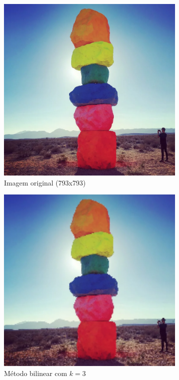 \documentclass[leqno]{article}
\begin{document}
\begin{figure}[H]
    \centering
    \begin{subfigure}{.33\textwidth}
      \centering
      \includegraphics[width=.7\linewidth]{../images/pedrascoloridas.png}
      \caption{Imagem original (793x793) }
      \label{fig:sub1}
    \end{subfigure}%
    \begin{subfigure}{.33\textwidth}
      \centering
      \includegraphics[width=.7\linewidth]{../images/pedrascoloridas_bil.png}
      \caption{Método bilinear com $k = 3$}
      \label{fig:sub2}
    \end{subfigure}
    \begin{subfigure}{.33\textwidth}
        \centering

\end{subfigure}
\end{figure}
\end{document}

